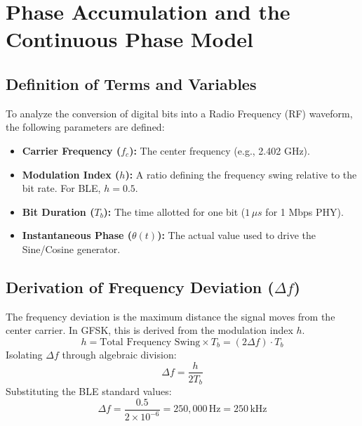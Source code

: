 \documentclass[12pt]{article}
\begin{document}
\section{Phase Accumulation and the Continuous Phase Model}

\subsection{Definition of Terms and Variables}
To analyze the conversion of digital bits into a Radio Frequency (RF) waveform, the following parameters are defined:
\begin{itemize}
    \item \textbf{Carrier Frequency ($f_c$):} The center frequency (e.g., 2.402 GHz).
    \item \textbf{Modulation Index ($h$):} A ratio defining the frequency swing relative to the bit rate. For BLE, $h = 0.5$.
    \item \textbf{Bit Duration ($T_b$):} The time allotted for one bit ($1 \, \mu s$ for 1 Mbps PHY).
    \item \textbf{Instantaneous Phase ($\theta(t)$):} The actual value used to drive the Sine/Cosine generator.
\end{itemize}

\subsection{Derivation of Frequency Deviation ($\Delta f$)}
The frequency deviation is the maximum distance the signal moves from the center carrier. In GFSK, this is derived from the modulation index $h$. 
\begin{equation}
h = \text{Total Frequency Swing} \times T_b = (2\Delta f) \cdot T_b
\end{equation}
Isolating $\Delta f$ through algebraic division:
\begin{equation}
\Delta f = \frac{h}{2T_b}
\end{equation}
Substituting the BLE standard values:
\begin{equation}
\Delta f = \frac{0.5}{2 \times 10^{-6}} = 250,000 \, \text{Hz} = 250 \, \text{kHz}
\end{equation}
\end{document}
